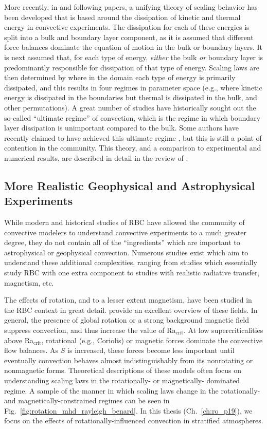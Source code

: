 More recently, in \citet{grossman&lohse2000} and following papers, a unifying theory of scaling behavior has been developed that is based around the dissipation of kinetic and thermal energy in convective experiments.
The dissipation for each of these energies is split into a bulk and boundary layer component, as it is assumed that different force balances dominate the equation of motion in the bulk or boundary layers.
It is next assumed that, for each type of energy, \emph{either} the bulk \emph{or} boundary layer is predominantly responsible for dissipation of that type of energy.
Scaling laws are then determined by where in the domain each type of energy is primarily dissipated, and this results in four regimes in parameter space (e.g., where kinetic energy is dissipated in the boundaries but thermal is dissipated in the bulk, and other permutations).
A great number of studies have historically sought out the so-called ``ultimate regime'' of convection, which is the regime in which boundary layer dissipation is unimportant compared to the bulk.
Some authors have recently claimed to have achieved this ultimate regime \citep[see e.g.,][]{zhu&all2018}, but this is still a point of contention in the community.
This theory, and a comparison to experimental and numerical results, are described in detail in the review of \citet{ahlers&all2009}.

\subsection{More Realistic Geophysical and Astrophysical Experiments}
While modern and historical studies of RBC have allowed the community of convective modelers to understand convective experiments to a much greater degree, they do not contain all of the ``ingredients'' which are important to astrophysical or geophysical convection.
Numerous studies exist which aim to understand these additional complexities, ranging from studies which essentially study RBC with one extra component to studies with realistic radiative transfer, magnetism, etc.

The effects of rotation, and to a lesser extent magnetism, have been studied in the RBC context in great detail.
\citet{plumley&julien2019} provide an excellent overview of these fields.
In general, the presence of global rotation or a strong background magnetic field suppress convection, and thus increase the value of Ra$_{\text{crit}}$.
At low supercriticalities above Ra$_{\text{crit}}$, rotational (e.g., Coriolis) or magnetic forces dominate the convective flow balances.
As $S$ is increased, these forces become less important until eventually convection behaves almost indistinguishably from its nonrotating or nonmagnetic forms.
Theoretical descriptions of these models often focus on understanding scaling laws in the rotationally- \citep[e.g.,][]{julien&all2012} or magnetically- \citep[e.g.,][]{cioni&all2000} dominated regime.
A sample of the manner in which scaling laws change in the rotationally- and magnetically-constrained regimes can be seen in Fig.~\ref{fig:rotation_mhd_rayleigh_benard}.
In this thesis (Ch.~\ref{ch:ro_p19}), we focus on the effects of rotationally-influenced convection in stratified atmospheres.

